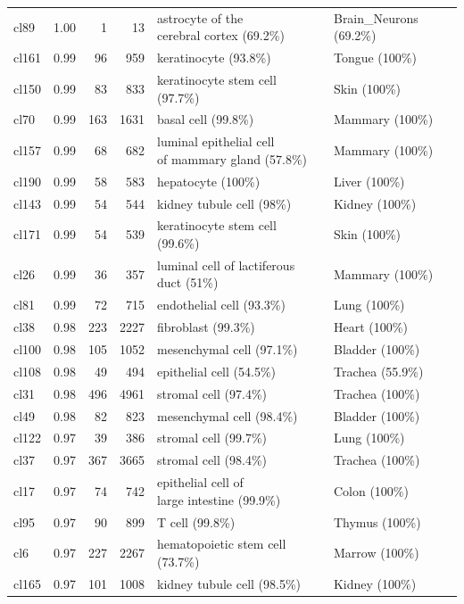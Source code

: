 \begin{table}[ht!]
\begin{tabular}{lrrrll}
  cl89 & 1.00 &   1 &  13 & \specialcell[t]{astrocyte of the\\cerebral cortex (69.2\%)} & Brain\_Neurons (69.2\%) \\ 
  cl161 & 0.99 &  96 & 959 & keratinocyte (93.8\%) & Tongue (100\%) \\ 
  cl150 & 0.99 &  83 & 833 & keratinocyte stem cell (97.7\%) & Skin (100\%) \\ 
  cl70 & 0.99 & 163 & 1631 & basal cell (99.8\%) & Mammary (100\%) \\ 
  cl157 & 0.99 &  68 & 682 & \specialcell[t]{luminal epithelial cell\\of mammary gland (57.8\%)} & Mammary (100\%) \\ 
  cl190 & 0.99 &  58 & 583 & hepatocyte (100\%) & Liver (100\%) \\ 
  cl143 & 0.99 &  54 & 544 & kidney tubule cell (98\%) & Kidney (100\%) \\ 
  cl171 & 0.99 &  54 & 539 & keratinocyte stem cell (99.6\%) & Skin (100\%) \\ 
  cl26 & 0.99 &  36 & 357 & luminal cell of lactiferous duct (51\%) & Mammary (100\%) \\ 
  cl81 & 0.99 &  72 & 715 & endothelial cell (93.3\%) & Lung (100\%) \\ 
  cl38 & 0.98 & 223 & 2227 & fibroblast (99.3\%) & Heart (100\%) \\ 
  cl100 & 0.98 & 105 & 1052 & mesenchymal cell (97.1\%) & Bladder (100\%) \\ 
  cl108 & 0.98 &  49 & 494 & epithelial cell (54.5\%) & Trachea (55.9\%) \\ 
  cl31 & 0.98 & 496 & 4961 & stromal cell (97.4\%) & Trachea (100\%) \\ 
  cl49 & 0.98 &  82 & 823 & mesenchymal cell (98.4\%) & Bladder (100\%) \\ 
  cl122 & 0.97 &  39 & 386 & stromal cell (99.7\%) & Lung (100\%) \\ 
  cl37 & 0.97 & 367 & 3665 & stromal cell (98.4\%) & Trachea (100\%) \\ 
  cl17 & 0.97 &  74 & 742 & \specialcell[t]{epithelial cell of\\large intestine (99.9\%)} & Colon (100\%) \\ 
  cl95 & 0.97 &  90 & 899 & T cell (99.8\%) & Thymus (100\%) \\ 
  cl6 & 0.97 & 227 & 2267 & hematopoietic stem cell (73.7\%) & Marrow (100\%) \\ 
  cl165 & 0.97 & 101 & 1008 & kidney tubule cell (98.5\%) & Kidney (100\%) \\ 

\end{tabular}
\end{table}
